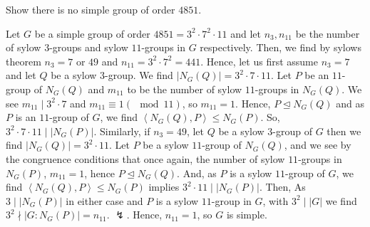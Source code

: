 \documentclass[a4paper]{article}
\begin{document}
\newpage
\begin{problem}[5]
	Show there is no simple group of order \(4851\).
\end{problem}
\begin{solution}
	Let \(G\) be a simple group of order \(4851 =  3^2 \cdot 7^2 \cdot 11\) and let \(n_3, n_{11}\) be the number of sylow \(3\)-groups and sylow \(11\)-groups in \(G\) respectively. Then, we find by sylows theorem \(n_3 =7\)  or \(49\) and \(n_{11} = 3^2 \cdot 7^2 = 441\). Hence, let us first assume \(n_3 = 7\) and let \(Q\) be a sylow \(3\)-group. We find \(\left| N_{G}\left( Q \right)  \right|  = 3^2 \cdot 7 \cdot 11\). Let \(P\) be an \(11\)-group of \(N_{G}\left( Q \right) \) and \(m_{11}\) to be the number of sylow \(11\)-groups in \(N_{G}\left( Q \right) \). We see \(m_{11} \mid 3^2 \cdot 7\) and \(m_{11} \equiv 1 \left( \mod 11 \right)  \), so \(m_{11} = 1\). Hence, \(P \trianglelefteq N_{G}\left( Q \right) \) and as \(P\) is an \(11\)-group of \(G\), we find \(\left<N_{G}\left( Q \right) , P \right> \le N_{G}\left( P \right) \). So, \(3^2 \cdot 7 \cdot 11 \mid \left| N_{G}\left( P \right)  \right| \).	Similarly, if \(n_3 = 49\), let \(Q\) be a sylow \(3\)-group of \(G\) then we find \(\left| N_{G}\left( Q \right)  \right| = 3^2 \cdot 11\). Let \(P\) be a sylow \(11\)-group of \(N_{G}\left( Q \right) \), and we see by the congruence conditions that once again, the number of sylow \(11\)-groups in \(N_{G}\left( P \right) \),  \(m_{11} = 1\), hence \(P \trianglelefteq N_{G}\left( Q \right) \). And, as \(P\) is a sylow \(11\)-group of \(G\), we find \(\left<N_{G}\left( Q \right) , P \right> \le N_{G}\left( P \right) \) implies \(3^2 \cdot 11 \mid \left| N_{G}\left( P \right)  \right| \). Then, As \(3 \mid \left| N_{G}\left( P \right) \right| \) in either case and \(P\) is a sylow \(11\)-group in \(G\), with \(3^2 \mid \left| G \right| \) we find \(3^2 \nmid \left| G : N_{G}\left( P \right)  \right| = n_{11}\). \(\lightning\). Hence, \(n_{11} = 1\), so \(G\) is simple.
\end{solution}
\end{document}
